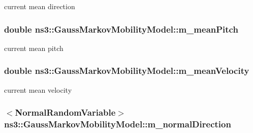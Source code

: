 current mean direction 

\subsubsection[{\texorpdfstring{m\+\_\+mean\+Pitch}{m_meanPitch}}]{\setlength{\rightskip}{0pt plus 5cm}double ns3\+::\+Gauss\+Markov\+Mobility\+Model\+::m\+\_\+mean\+Pitch\hspace{0.3cm}{\ttfamily [private]}}\hypertarget{classns3_1_1GaussMarkovMobilityModel_ab86745509d75f2faf71f7f42b1aab88d}{}\label{classns3_1_1GaussMarkovMobilityModel_ab86745509d75f2faf71f7f42b1aab88d}


current mean pitch 

\subsubsection[{\texorpdfstring{m\+\_\+mean\+Velocity}{m_meanVelocity}}]{\setlength{\rightskip}{0pt plus 5cm}double ns3\+::\+Gauss\+Markov\+Mobility\+Model\+::m\+\_\+mean\+Velocity\hspace{0.3cm}{\ttfamily [private]}}\hypertarget{classns3_1_1GaussMarkovMobilityModel_a2ceee7209674820e7b3acc075c8376b1}{}\label{classns3_1_1GaussMarkovMobilityModel_a2ceee7209674820e7b3acc075c8376b1}


current mean velocity 

\subsubsection[{\texorpdfstring{m\+\_\+normal\+Direction}{m_normalDirection}}]{$<${\bf Normal\+Random\+Variable}$>$ ns3\+::\+Gauss\+Markov\+Mobility\+Model\+::m\+\_\+normal\+Direction\hspace{0.3cm}{\ttfamily [private]}}\hypertarget{classns3_1_1GaussMarkovMobilityModel_a05f43bae64f0bd5185c9f8d6751c1fb5}{}\label{classns3_1_1GaussMarkovMobilityModel_a05f43bae64f0bd5185c9f8d6751c1fb5}


